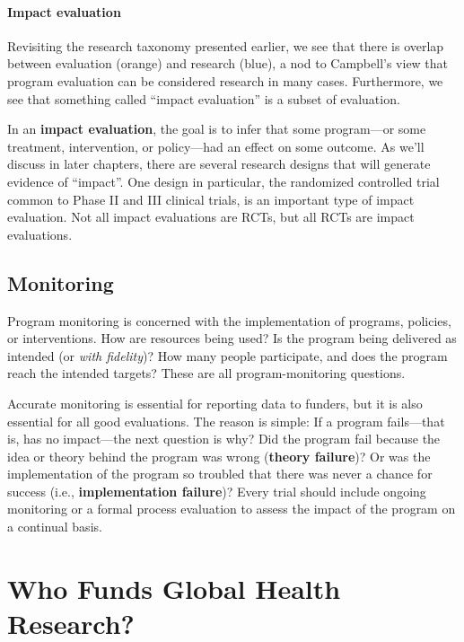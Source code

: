 \documentclass[justified,twoside,symmetric,]{tufte-book}
\let\subsubsection\subsection
\begin{document}
\hypertarget{impact-evaluation}{%
\paragraph*{Impact evaluation}\label{impact-evaluation}}

Revisiting the research taxonomy presented earlier, we see that there is overlap between evaluation (orange) and research (blue), a nod to Campbell's view that program evaluation can be considered research in many cases. Furthermore, we see that something called ``impact evaluation'' is a subset of evaluation.

In an \textbf{impact evaluation}, the goal is to infer that some program---or some treatment, intervention, or policy---had an effect on some outcome. As we'll discuss in later chapters, there are several research designs that will generate evidence of ``impact''. One design in particular, the randomized controlled trial common to Phase II and III clinical trials, is an important type of impact evaluation. Not all impact evaluations are RCTs, but all RCTs are impact evaluations.

\hypertarget{monitoring}{%
\subsubsection*{Monitoring}\label{monitoring}}

Program monitoring is concerned with the implementation of programs, policies, or interventions. How are resources being used? Is the program being delivered as intended (or \emph{with fidelity})? How many people participate, and does the program reach the intended targets? These are all program-monitoring questions.

Accurate monitoring is essential for reporting data to funders, but it is also essential for all good evaluations. The reason is simple: If a program fails---that is, has no impact---the next question is why? Did the program fail because the idea or theory behind the program was wrong (\textbf{theory failure})? Or was the implementation of the program so troubled that there was never a chance for success (i.e., \textbf{implementation failure})? Every trial should include ongoing monitoring or a formal process evaluation to assess the impact of the program on a continual basis.

\hypertarget{who-funds-global-health-research}{%
\section{Who Funds Global Health Research?}\label{who-funds-global-health-research}}
\end{document}
